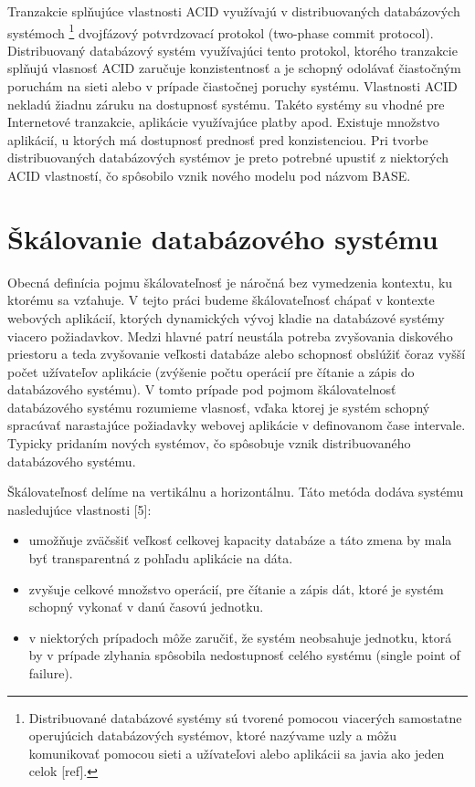 \documentclass[11pt,twoside,a4paper]{book}
\begin{document}
Tranzakcie splňujúce vlastnosti ACID využívajú v distribuovaných databázových systémoch \footnote{Distribuované databázové systémy sú tvorené pomocou viacerých samostatne operujúcich databázových systémov, ktoré nazývame uzly a môžu komunikovať pomocou sieti a užívateľovi alebo aplikácii sa javia ako jeden celok [ref].} dvojfázový potvrdzovací protokol (two-phase commit protocol). Distribuovaný databázový systém využívajúci tento protokol, ktorého tranzakcie splňujú vlasnosť ACID zaručuje konzistentnosť a je schopný odolávať čiastočným poruchám na sieti alebo v prípade čiastočnej poruchy systému. Vlastnosti ACID nekladú žiadnu záruku na dostupnosť systému. Takéto systémy su vhodné pre Internetové tranzakcie, aplikácie využívajúce platby apod. Existuje množstvo aplikácií, u ktorých má dostupnosť prednosť pred konzistenciou. Pri tvorbe distribuovaných databázových systémov je preto potrebné upustiť z niektorých ACID vlastností, čo spôsobilo vznik nového modelu pod názvom BASE.


\section{Škálovanie databázového systému} %
Obecná definícia pojmu škálovateľnosť \cite{scalability} je náročná  bez vymedzenia kontextu, ku ktorému sa vzťahuje. V tejto práci budeme škálovateľnosť chápať v kontexte webových aplikácií, ktorých dynamických vývoj kladie na databázové systémy viacero požiadavkov. Medzi hlavné patrí neustála potreba zvyšovania diskového priestoru a teda zvyšovanie veľkosti databáze alebo schopnosť obslúžiť čoraz vyšší počet užívateľov aplikácie (zvýšenie počtu operácií pre čítanie a zápis do databázového systému). V tomto prípade pod pojmom škálovatelnosť databázového systému rozumieme vlasnosť, vďaka ktorej je systém schopný spracúvať narastajúce požiadavky webovej aplikácie v definovanom čase intervale. Typicky pridaním nových systémov, čo spôsobuje vznik distribuovaného databázového systému.

Škálovateľnosť delíme na vertikálnu a horizontálnu. Táto metóda dodáva systému nasledujúce vlastnosti [5]:
\begin{itemize}
 \item umožňuje zväčsšiť veľkosť celkovej kapacity databáze a táto zmena by mala byť transparentná z pohľadu aplikácie na dáta.
  \item zvyšuje celkové množstvo operácií, pre čítanie a zápis dát, ktoré je systém schopný vykonať v danú časovú jednotku.
  \item v niektorých prípadoch môže zaručiť, že systém neobsahuje jednotku, ktorá by v prípade zlyhania spôsobila nedostupnosť celého systému (single point of failure).
\end{itemize}
\end{document}
